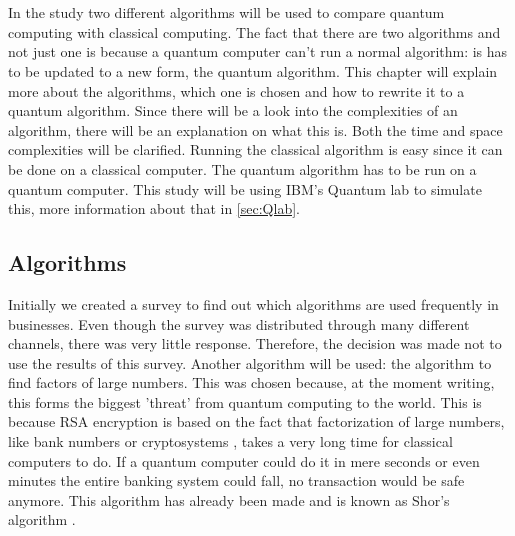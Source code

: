 
\chapter{}
\label{ch:methodologie}


In the study two different algorithms will be used to compare quantum computing with classical computing. 
The fact that there are two algorithms and not just one is because a quantum computer can't run a normal algorithm: is has to be updated to a new form, the quantum algorithm.
This chapter will explain more about the algorithms, which one is chosen and how to rewrite it to a quantum algorithm. Since there will be a look into the complexities of an algorithm, there will be an explanation on what this is.
Both the time and space complexities will be clarified. Running the classical algorithm is easy since it can be done on a classical computer. The quantum algorithm has to be run on a quantum computer.
This study will be using IBM's Quantum lab to simulate this, more information about that in \ref{sec:Qlab}.
\section{Algorithms}
Initially we created a survey to find out which algorithms are used frequently in businesses. Even though the survey was distributed through many different channels, there was very little response. Therefore, the decision was made not to use the results of this survey.
Another algorithm will be used: the algorithm to find factors of large numbers. This was chosen because, at the moment writing, this forms the biggest 'threat' from quantum computing to the world.
This is because RSA encryption is based on the fact that factorization of large numbers, like bank numbers or cryptosystems \autocite{Shor}, takes a very long time  for classical computers to do. If a quantum computer could do it in mere seconds or even minutes the entire banking system could fall, no transaction would be safe anymore.
This algorithm has already been made and is known as Shor's algorithm \autocite{Shor}.
